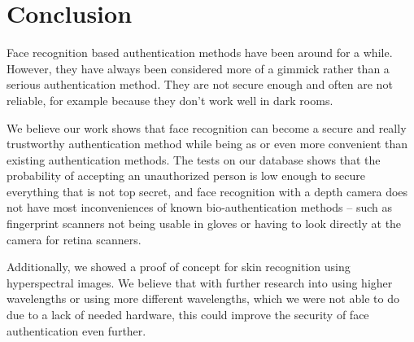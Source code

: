 \chapter{Conclusion}
    Face recognition based authentication methods have been around for a while. However,
    they have always been considered more of a gimmick rather than a serious
    authentication method. They are not secure enough and often are not reliable,
    for example because they don't work well in dark rooms.

    We believe our work shows that face recognition can become a secure and
    really trustworthy authentication method while being as or even more
    convenient than existing authentication methods.
    The tests on our database shows that the probability of accepting
    an unauthorized person is low enough to secure everything that is not top secret,
    and face recognition with a depth camera does not have most inconveniences
    of known bio-authentication methods -- such as fingerprint scanners not
    being usable in gloves or having to look directly at the camera for
    retina scanners.

    Additionally, we showed a proof of concept for skin recognition using
    hyperspectral images. We believe that with further research into
    using higher wavelengths or using more different wavelengths,
    which we were not able to do due to a lack of needed hardware,
    this could improve the security of face authentication even further.
